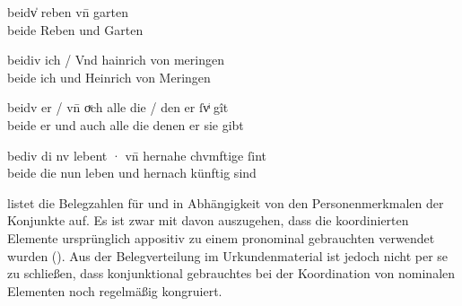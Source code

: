 \begin{exe}
\ex \label{ex:caokonj2ctrl}
	\begin{xlist}
	\ex \label{ex:caokonj2ctrl_1}
		\gll beidv̍ reben vn̄ garten \\
			beide Reben und Garten \\
		\trans {}
			\parencites(Nr.~2353, Basel, 1296)[462,28--29]{cao3}

	\ex \label{ex:caokonj2ctrl_2}
		\gll beidiv ich / Vnd hainrich von meringen \\
			beide ich {} und Heinrich von Meringen \\
		\trans {}
			\parencites(Nr.~1347, Kl.~Steingaden, Kr.~Weilheim-Schongau, 1291)[578,25]{cao1}

	\ex \label{ex:caokonj2ctrl_3}
		\gll beidv er / vn̄ oͮch alle die / den er ſvͥ gît \\
			beide er {} und auch alle die {} denen er sie gibt \\
		\trans {}
			\parencites(Nr.~1566, Hüfingen, Schwarzwald-Baar-Kr., 1292)[717,18]{cao2}

	\ex \label{ex:caokonj2ctrl_4}
		\gll bediv di nv lebent · vn̄ hernahe chvmftige ſint \\
			beide die nun leben {} und hernach künftig sind \\
		\trans {}
			\parencites(Nr.~1352, Wien, 1291)[580,8]{cao2}
	\end{xlist}
\end{exe}

 listet die Belegzahlen für  und
 in Abhängigkeit von den Personenmerkmalen der
Konjunkte auf. Es ist zwar mit \citet[626]{ksw2} davon auszugehen, dass die
koordinierten Elemente ursprünglich appositiv zu einem
pronominal gebrauchten  verwendet wurden ().
Aus der Belegverteilung im Urkundenmaterial ist jedoch nicht per se zu
schließen, dass konjunktional gebrauchtes  bei der Koordination von
nominalen Elementen noch regelmäßig kongruiert.

